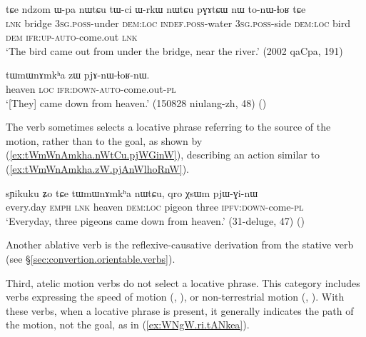 \begin{exe}
\ex \label{ex:Wpa.nWtCu.tonWlhoR}
\gll  tɕe ndzom ɯ-pa nɯtɕu tɯ-ci ɯ-rkɯ nɯtɕu pɣɤtɕɯ nɯ to-nɯ-ɬoʁ tɕe \\
\textsc{lnk} bridge \textsc{3sg}.\textsc{poss}-under \textsc{dem}:\textsc{loc} \textsc{indef}.\textsc{poss}-water \textsc{3sg}.\textsc{poss}-side \textsc{dem}:\textsc{loc} bird \textsc{dem} \textsc{ifr}:\textsc{up}-\textsc{auto}-come.out \textsc{lnk} \\
\glt  `The bird came out from under the bridge, near the river.' (2002 qaCpa, 191)
\end{exe}

\begin{exe}
\ex \label{ex:tWmWnAmkha.zW.pjAnWlhoRnW}
\gll  tɯmɯnɤmkʰa zɯ pjɤ-nɯ-ɬoʁ-nɯ. \\
heaven \textsc{loc} \textsc{ifr}:\textsc{down}-\textsc{auto}-come.out-\textsc{pl} \\
\glt `[They] came down from heaven.' (150828 niulang-zh, 48) ()
\end{exe}

The verb  sometimes selects a locative phrase referring to the source of the motion, rather than to the goal, as shown by (\ref{ex:tWmWnAmkha.nWtCu.pjWGinW}), describing an action similar to (\ref{ex:tWmWnAmkha.zW.pjAnWlhoRnW}).

\begin{exe}
\ex \label{ex:tWmWnAmkha.nWtCu.pjWGinW}
\gll sɲikuku ʑo tɕe tɯmɯnɤmkʰa nɯtɕu, qro χsɯm pjɯ-ɣi-nɯ \\
every.day \textsc{emph} \textsc{lnk} heaven \textsc{dem}:\textsc{loc} pigeon three \textsc{ipfv}:\textsc{down}-come-\textsc{pl} \\
\glt `Everyday, three pigeons came down from heaven.' (31-deluge, 47)
()
\end{exe}

Another ablative verb is the reflexive-causative  derivation from the stative verb   (see §\ref{sec:convertion.orientable.verbs}).

Third, atelic motion verbs do not select a locative phrase. This category includes verbs expressing the speed of motion (, ), or non-terrestrial motion (, ). With these verbs, when a locative phrase is present, it generally indicates the path of the motion, not the goal, as in (\ref{ex:WNgW.ri.tANkea}).

